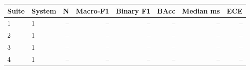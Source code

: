 \begin{tabular}{@{}llrrrrrr@{}}
\toprule
Suite & System & N & Macro-F1 & Binary F1 & BAcc & Median ms & ECE \\
\midrule
1 & 1 & -- & -- & -- & -- & -- & -- \\
2 & 1 & -- & -- & -- & -- & -- & -- \\
3 & 1 & -- & -- & -- & -- & -- & -- \\
4 & 1 & -- & -- & -- & -- & -- & -- \\
\bottomrule
\end{tabular}
